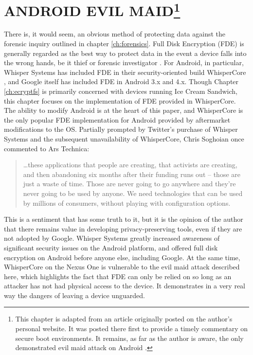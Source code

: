 \chapter[ANDROID EVIL MAID]{ANDROID EVIL MAID\protect\footnote{This chapter is adapted from an article originally posted on the author's personal
website. It was posted there first to provide a timely commentary on secure boot environments. It remains, as far as the author is
aware, the only demonstrated evil maid attack on Android \protect\cite{androidevilmaid}.}}
\label{ch:fde}

There is, it would seem, an obvious method of protecting data against the forensic inquiry outlined in chapter \ref{ch:forensics}.
Full Disk Encryption (FDE) is generally regarded as the best way to protect data in the event a device falls into the wrong hands,
be it thief or forensic investigator \cite{fdeworks}.  For Android, in particular, Whisper Systems has included FDE in their
security-oriented build WhisperCore \cite{whispercore}, and Google itself has included FDE in Android 3.x and 4.x. Though Chapter
\ref{ch:ecryptfs} is primarily concerned with devices running Ice Cream Sandwich, this chapter focuses on the implementation of FDE
provided in WhisperCore.  The ability to modify Android is at the heart of this paper, and WhisperCore is the only popular FDE
implementation for Android provided by aftermarket modifications to the OS.  Partially prompted by Twitter's purchase of Whisper
Systems and the subsequent unavailability of WhisperCore, Chris Soghoian once commented to Ars Technica: \begin{quote} \ldots these
applications that people are creating, that activists are creating, and then abandoning six months after their funding runs out --
those are just a waste of time. Those are never going to go anywhere and they're never going to be used by anyone. We need
technologies that can be used by millions of consumers, without playing with configuration options. \cite{arstechnica} \end{quote}
This is a sentiment that has some truth to it, but it is the opinion of the author that there remains value in developing
privacy-preserving tools, even if they are not adopted by Google.  Whisper Systems greatly increased awareness of significant
security issues on the Android platform, and offered full disk encryption on Android before anyone else, including Google.  At the
same time, WhisperCore on the Nexus One is vulnerable to the evil maid attack described here, which highlights the fact that FDE can
only be relied on so long as an attacker has not had physical access to the device. It demonstrates in a very real way the dangers
of leaving a device unguarded. 

